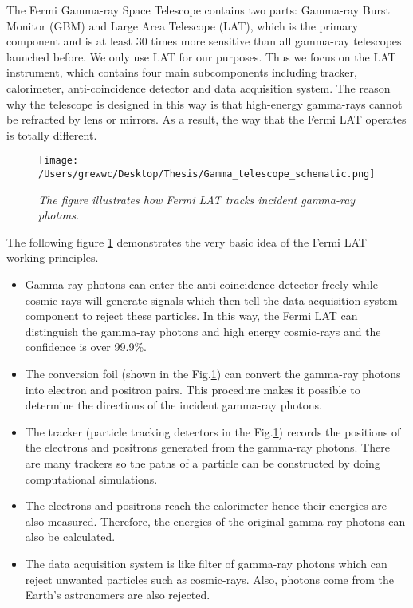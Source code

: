 \documentclass[12pt]{report}
\newcommand{\mycaption}[1]{\caption{\textit{\footnotesize #1}}}
\begin{document}
        The Fermi Gamma-ray Space Telescope contains two parts: Gamma-ray Burst Monitor (GBM) and Large 
        Area Telescope (LAT), which is the primary component and is at least 30 times more sensitive than 
        all gamma-ray telescopes launched before. We only use LAT for our purposes. Thus we 
        focus on the LAT instrument, which contains four main subcomponents including tracker, calorimeter,
        anti-coincidence detector and data acquisition system. The reason why the telescope is designed in 
        this way is that high-energy gamma-rays cannot be refracted by lens or mirrors. As a result, the way
        that the Fermi LAT operates is totally different. 

        \begin{figure}[!ht]  
          \centering
              \texttt{[image: /Users/grewwc/Desktop/Thesis/Gamma\_telescope\_schematic.png]}
              \mycaption{The figure illustrates how Fermi LAT tracks incident gamma-ray photons.}
              \label{fig:fermi schematic}
        \end{figure}
        The following figure \ref{fig:fermi schematic} demonstrates the very basic idea of the Fermi LAT working
        principles. \\

        \begin{itemize}
          \item Gamma-ray photons can enter the anti-coincidence detector freely while cosmic-rays will generate
            signals which then tell the data acquisition system component to reject these particles. 
            In this way, the 
            Fermi LAT can distinguish the gamma-ray photons and high energy cosmic-rays and the confidence is 
            over 99.9\%. 
          \item The conversion foil (shown in the Fig.\ref{fig:fermi schematic}) can convert the 
            gamma-ray photons into electron and positron pairs. This procedure makes it possible to determine 
            the directions of the incident gamma-ray photons. 
          \item The tracker (particle tracking detectors in the Fig.\ref{fig:fermi schematic}) records the 
            positions of the electrons and positrons generated from the gamma-ray photons. There are many 
            trackers so the paths of a particle can be constructed by doing computational simulations.
          \item The electrons and positrons reach the calorimeter hence their energies are also measured.
            Therefore, the energies of the original gamma-ray photons can also be calculated. 
          \item The data acquisition system is like filter of gamma-ray photons which can 
            reject unwanted particles such as cosmic-rays.
            Also, photons come from the Earth's astronomers are also rejected. 
        \end{itemize}
\end{document}
